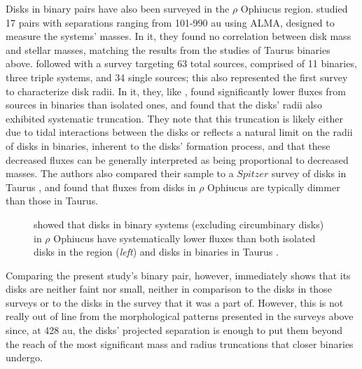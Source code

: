 Disks in binary pairs have also been surveyed in the $\rho$ Ophiucus region. \citet{Akeson2014} studied 17 pairs with separations ranging from 101-990 au using ALMA, designed to measure the systems' masses. In it, they found no correlation between disk mass and stellar masses, matching the results from the studies of Taurus binaries above. \citet{Cox2017} followed with a survey targeting 63 total sources, comprised of 11 binaries, three triple systems, and 34 single sources; this also represented the first survey to characterize disk radii. In it, they, like \citet{Harris2012,Akeson2019}, found significantly lower fluxes from sources in binaries than isolated ones, and found that the disks' radii also exhibited systematic truncation. They note that this truncation is likely either due to tidal interactions between the disks or reflects a natural limit on the radii of disks in binaries, inherent to the disks' formation process, and that these decreased fluxes can be generally interpreted as being proportional to decreased masses. The authors also compared their sample to a $Spitzer$ survey of disks in Taurus \citep{Rebull2010}, and found that fluxes from disks in $\rho$ Ophiucus are typically dimmer than those in Taurus.


 \begin{figure}[h]
   \hspace*{\fill}%
   \hspace*{\fill}%
   \caption{\citet{Cox2017} showed that disks in binary systems (excluding circumbinary disks) in $\rho$ Ophiucus have systematically lower fluxes than both isolated disks in the region (\textit{left}) and disks in binaries in Taurus \citep[from][]{Rebull2012}.}
   \label{fig:rhoOph_binaries}
 \end{figure}



Comparing the present study's binary pair, however, immediately shows that its disks are neither faint nor small, neither in comparison to the disks in those surveys or to the disks in the survey that it was a part of. However, this is not really out of line from the morphological patterns presented in the surveys above since, at 428 au, the disks' projected separation is enough to put them beyond the reach of the most significant mass and radius truncations that closer binaries undergo.

